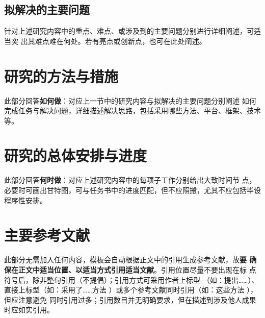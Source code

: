 \subsection{拟解决的主要问题}

\begin{tcolorbox}
	针对上述研究内容中的重点、难点、或涉及到的主要问题分别进行详细阐述，可适当突
	出其难点难在何处。若有亮点或创新点，也可在此处阐述。
\end{tcolorbox}

\section{研究的方法与措施}

\begin{tcolorbox}
	此部分回答\textbf{如何做}：对应上一节中的研究内容与拟解决的主要问题分别阐述
	如何完成任务与解决问题，详细描述解决思路，包括采用哪些方法、平台、框架、技术
	等。
\end{tcolorbox}

\section{研究的总体安排与进度}

\begin{tcolorbox}
	此部分回答\textbf{何时做}：对应上述研究内容中的每项子工作分别给出大致时间节
	点，必要时可画出甘特图，可与任务书中的进度匹配，但不应照搬，尤其不应包括毕设
	程序性安排。
\end{tcolorbox}

\section{主要参考文献}

\begin{tcolorbox}
	此部分无需加入任何内容，模板会自动根据正文中的引用生成参考文献，故\textbf{要
		确保在正文中适当位置、以适当方式引用适当文献}。引用位置尽量不要出现在标
	点符号后，除非整句引用（不提倡）；引用方式可采用作者上标型
	（如：\citet{chen1980zhongguo}提出……）、直接上标型（如：采用了……方法
	\citep{chen2005zhulu}）或多个参考文献同时引用（如：这些方法
	\citep{Bohan1928,chu2004tushu,Dubrovin1906,hls2012jinji}），但应注意避免
	同时引用过多；引用数目并无明确要求，但在描述到涉及他人成果时应如实引用。
\end{tcolorbox}